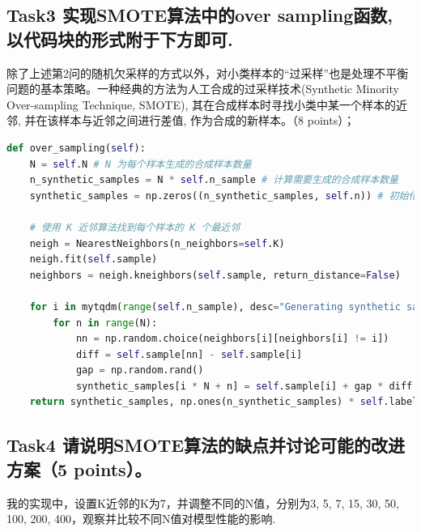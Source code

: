 \documentclass[8pt]{article}
\begin{document}
\subsection*{Task3 实现SMOTE算法中的over sampling函数, 以代码块的形式附于下方即可.}
除了上述第2问的随机欠采样的方式以外，对小类样本的“过采样”也是处理不平衡问题的基本策略。一种经典的方法为人工合成的过采样技术(Synthetic Minority Over-sampling Technique, SMOTE), 其在合成样本时寻找小类中某一个样本的近邻, 并在该样本与近邻之间进行差值, 作为合成的新样本。（8 points）；
\begin{lstlisting}[breaklines=true, language=Python, caption=过采样函数实现]
def over_sampling(self):
    N = self.N # N 为每个样本生成的合成样本数量
    n_synthetic_samples = N * self.n_sample # 计算需要生成的合成样本数量
    synthetic_samples = np.zeros((n_synthetic_samples, self.n)) # 初始化合成样本数组

    # 使用 K 近邻算法找到每个样本的 K 个最近邻
    neigh = NearestNeighbors(n_neighbors=self.K)
    neigh.fit(self.sample)
    neighbors = neigh.kneighbors(self.sample, return_distance=False)

    for i in mytqdm(range(self.n_sample), desc="Generating synthetic samples"):
        for n in range(N):
            nn = np.random.choice(neighbors[i][neighbors[i] != i])
            diff = self.sample[nn] - self.sample[i]
            gap = np.random.rand()
            synthetic_samples[i * N + n] = self.sample[i] + gap * diff
    return synthetic_samples, np.ones(n_synthetic_samples) * self.label
\end{lstlisting}

\subsection*{Task4 请说明SMOTE算法的缺点并讨论可能的改进方案（5 points）。}
我的实现中，设置K近邻的K为7，并调整不同的N值，分别为3, 5, 7, 15, 30, 50, 100, 200, 400，观察并比较不同N值对模型性能的影响.
\end{document}
